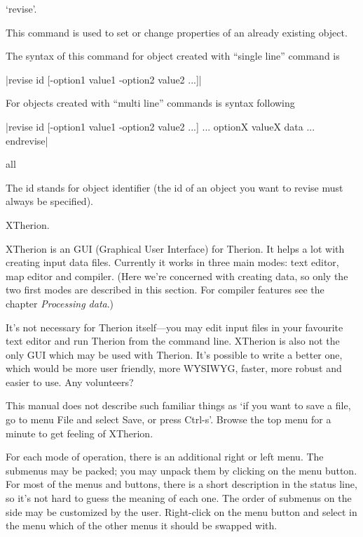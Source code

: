 \options
\endoptions


\subsubchapter `revise'.

\description
  This command is used to set or change properties of an already 
  existing object.
\enddescription

\syntax
  The syntax of this command for 
  object created with ``single line'' command is
  
  |revise id [-option1 value1 -option2 value2 ...]|
  
  For objects created with ``multi line'' commands is syntax following

|revise id [-option1 value1 -option2 value2 ...]
  ...
  optionX valueX
  data
  ...
endrevise|
\endsyntax

\context
  all
\endcontext

\arguments
  The id stands for object identifier (the id of an object you want to
  revise must always be specified).
\endarguments




\subchapter XTherion.

XTherion is an GUI (Graphical User Interface) for Therion. 
It helps a lot with creating input data files. Currently it works in 
three main modes: text editor, map editor and compiler. (Here we're concerned 
with creating data, so only the two first modes are described in this section. For compiler 
features see the chapter {\it Processing data}.)

It's not necessary for Therion itself---you may edit input files in your 
favourite text editor and run Therion from the command line. XTherion is also 
not the only GUI which may be used with Therion. It's possible to 
write a better one, which would be more user friendly, more WYSIWYG, faster, 
more robust and easier to use. Any volunteers?

This manual does not describe such familiar things as `if you want to save a file, go to 
menu File and select Save, or press Ctrl-s'. Browse the top menu for a minute 
to get feeling of XTherion. 

For each mode of operation, there is an additional 
right or left menu. The submenus may be packed; you may unpack them by 
clicking on the menu button. For most of the menus and buttons, there is a short 
description in the status line, so it's not hard to guess the meaning of each one.
The order of submenus on the side may be customized by the user. Right-click on 
the menu button and select in the menu which of the other menus it should 
be swapped with.



